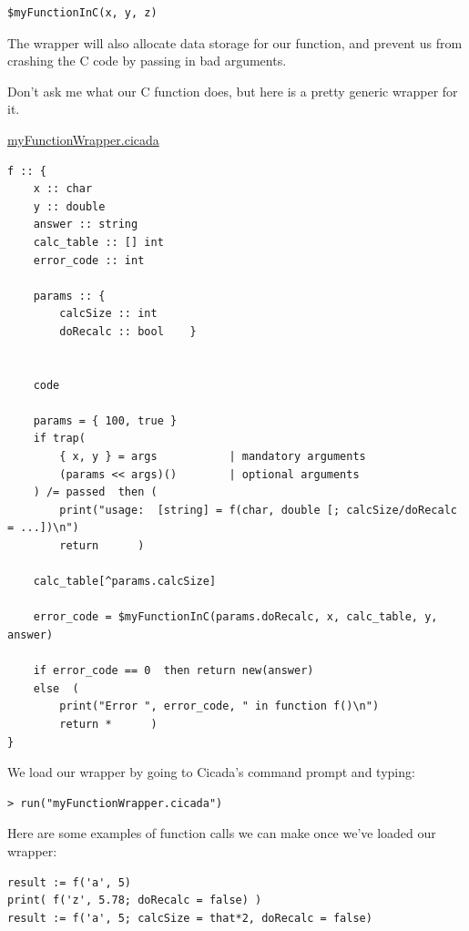 \documentclass{article}
\newenvironment{code}{
       \begin{list}{}{
               \setlength{\leftmargin}{.4in}
               \setlength{\rightmargin}{0in}
               \setlength{\topsep}{.2in}
       }
       \small
       \item[] }
       { \end{list}   }
\begin{document}
\begin{code} \begin{verbatim}
$myFunctionInC(x, y, z)
\end{verbatim} \end{code}

\noindent The wrapper will also allocate data storage for our function, and prevent us from crashing the C code by passing in bad arguments.

Don't ask me what our C function does, but here is a pretty generic wrapper for it.\\\vspace{.2in}

\noindent \underline{myFunctionWrapper.cicada}

\begin{code} \begin{verbatim}
f :: {
    x :: char
    y :: double
    answer :: string
    calc_table :: [] int
    error_code :: int
    
    params :: {
        calcSize :: int
        doRecalc :: bool    }
    
    
    code
    
    params = { 100, true }
    if trap(
        { x, y } = args           | mandatory arguments
        (params << args)()        | optional arguments
    ) /= passed  then (
        print("usage:  [string] = f(char, double [; calcSize/doRecalc = ...])\n")
        return      )
    
    calc_table[^params.calcSize]
    
    error_code = $myFunctionInC(params.doRecalc, x, calc_table, y, answer)
    
    if error_code == 0  then return new(answer)
    else  (
        print("Error ", error_code, " in function f()\n")
        return *      )
}
\end{verbatim} \end{code}

\noindent We load our wrapper by going to Cicada's command prompt and typing:

\begin{code} \begin{verbatim}
> run("myFunctionWrapper.cicada")
\end{verbatim} \end{code}

\noindent Here are some examples of function calls we can make once we've loaded our wrapper:

\begin{code} \begin{verbatim}
result := f('a', 5)
print( f('z', 5.78; doRecalc = false) )
result := f('a', 5; calcSize = that*2, doRecalc = false)
\end{verbatim} \end{code}
\end{document}
